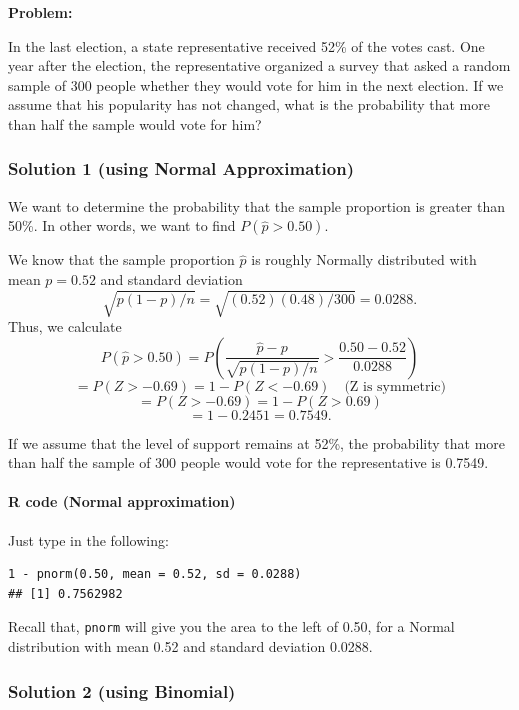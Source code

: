 \textbf{Problem:}

In the last election, a state representative received 52\% of the votes cast. One year after the election, the representative organized a survey that asked a random sample of 300 people whether they would vote for him in the next election. If we assume that his popularity has not changed, what is the probability that more than half the sample would vote for him?

\vspace{1em}
\subsubsection*{Solution 1 (using Normal Approximation)}

We want to determine the probability that the sample proportion is greater than 50\%. In other words, we want to find $P(\hat{p} > 0.50)$.

We know that the sample proportion $\hat{p}$ is roughly Normally distributed with mean $p = 0.52$ and standard deviation
\[
\sqrt{p(1 - p)/n} = \sqrt{(0.52)(0.48)/300} = 0.0288.
\]
Thus, we calculate
\[
P(\hat{p} > 0.50) = P\left( \frac{\hat{p} - p}{\sqrt{p(1-p)/n}} > \frac{0.50 - 0.52}{0.0288} \right)
\]
\[
= P(Z > -0.69) = 1 - P(Z < -0.69) \quad \text{(Z is symmetric)}
\]
\[
= P(Z > -0.69) = 1 - P(Z > 0.69)
\]
\[
= 1 - 0.2451 = 0.7549.
\]

If we assume that the level of support remains at 52\%, the probability that more than half the sample of 300 people would vote for the representative is 0.7549.
\paragraph*{R code (Normal approximation)}

Just type in the following:

\begin{verbatim}
1 - pnorm(0.50, mean = 0.52, sd = 0.0288)
## [1] 0.7562982
\end{verbatim}

Recall that, \texttt{pnorm} will give you the area to the left of 0.50, for a Normal distribution with mean 0.52 and standard deviation 0.0288.
\subsubsection*{Solution 2 (using Binomial)}

